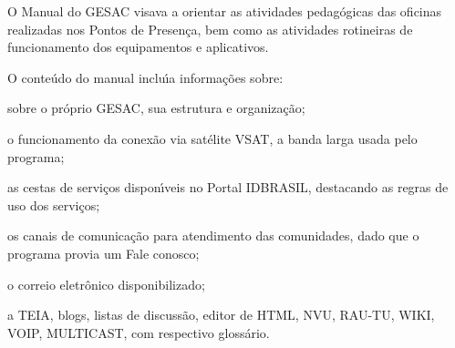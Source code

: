 \documentclass[
12pt,		%
openright,	%
twoside,  %
a4paper,			%
chapter=TITLE,		%
english,			%
french,				%
spanish,			%
brazil				%
]{USPSC-classe/USPSC}
\begin{document}
O Manual do GESAC visava a orientar as atividades pedag\'ogicas das oficinas realizadas nos Pontos de Presen\c{c}a, bem como as  atividades rotineiras de funcionamento dos equipamentos e aplicativos.

















O conte\'udo do manual inclu\'{\i}a informa\c{c}\~oes sobre:


















\begin{alineas}
\item sobre o pr\'oprio GESAC, sua estrutura e organiza\c{c}\~ao;
\item o funcionamento da conex\~ao via sat\'elite VSAT, a banda larga usada pelo programa;
\item as cestas de servi\c{c}os dispon\'{\i}veis no Portal IDBRASIL, destacando as regras de uso dos servi\c{c}os;
\item os canais de comunica\c{c}\~ao para atendimento das comunidades, dado que o programa provia um \textquotedbl Fale conosco\textquotedbl ;
\item  o correio eletr\^onico disponibilizado;
\item a TEIA, blogs, listas de discuss\~ao, editor de HTML, NVU, RAU-TU, WIKI, VOIP, MULTICAST, com respectivo gloss\'ario.
\end{alineas}


\noindent\begin{center}\mbox{\centering{}}\end{center}
\end{document}
